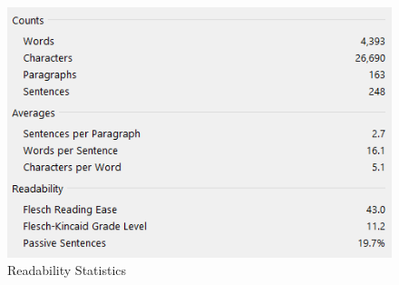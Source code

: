 \documentclass[a4paper,12pt]{report}
\begin{document}
    
    \nocite{*}

    
    

    
    \listoffigures
    
    \newpage
    \begin{figure}[!h]
        \includegraphics[width=\linewidth]{readability.png}
        \centering
        \caption{Readability Statistics}
    \end{figure}
\end{document}
